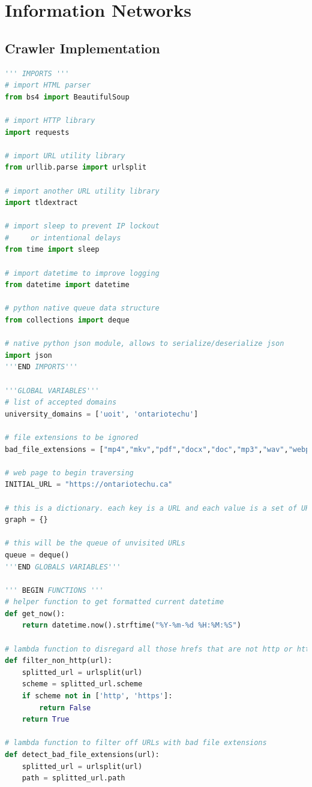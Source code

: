 \section{Information Networks}

\subsection{Crawler Implementation}
\begin{lstlisting}[language=Python]
''' IMPORTS '''
# import HTML parser
from bs4 import BeautifulSoup

# import HTTP library
import requests

# import URL utility library
from urllib.parse import urlsplit

# import another URL utility library
import tldextract

# import sleep to prevent IP lockout
#     or intentional delays
from time import sleep

# import datetime to improve logging
from datetime import datetime

# python native queue data structure
from collections import deque

# native python json module, allows to serialize/deserialize json
import json
'''END IMPORTS'''

'''GLOBAL VARIABLES'''
# list of accepted domains
university_domains = ['uoit', 'ontariotechu'] 

# file extensions to be ignored
bad_file_extensions = ["mp4","mkv","pdf","docx","doc","mp3","wav","webp", "jpg", "png"]

# web page to begin traversing
INITIAL_URL = "https://ontariotechu.ca"

# this is a dictionary. each key is a URL and each value is a set of URLs that are referenced by the key
graph = {}

# this will be the queue of unvisited URLs
queue = deque()
'''END GLOBALS VARIABLES'''

''' BEGIN FUNCTIONS '''
# helper function to get formatted current datetime
def get_now():
    return datetime.now().strftime("%Y-%m-%d %H:%M:%S")

# lambda function to disregard all those hrefs that are not http or https pages
def filter_non_http(url):
    splitted_url = urlsplit(url)
    scheme = splitted_url.scheme
    if scheme not in ['http', 'https']:
        return False
    return True

# lambda function to filter off URLs with bad file extensions
def detect_bad_file_extensions(url):
    splitted_url = urlsplit(url)
    path = splitted_url.path


\end{lstlisting}

